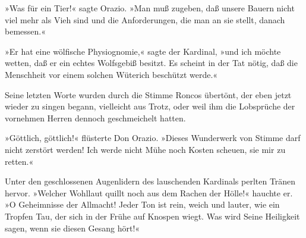 »Was für ein Tier!« sagte Orazio. »Man muß zugeben, daß unsere
Bauern nicht viel mehr als Vieh sind und die Anforderungen, die man
an sie stellt, danach bemessen.«

»Er hat eine wölfische Physiognomie,« sagte der Kardinal, »und ich
möchte wetten, daß er ein echtes Wolfsgebiß besitzt. Es scheint in
der Tat nötig, daß die Menschheit vor einem solchen Wüterich
beschützt werde.«

Seine letzten Worte wurden durch die Stimme Roncos übertönt, der
eben jetzt wieder zu singen begann, vielleicht aus Trotz, oder weil
ihm die Lobsprüche der vornehmen Herren dennoch geschmeichelt
hatten.

»Göttlich, göttlich!« flüsterte Don Orazio. »Dieses Wunderwerk von
Stimme darf nicht zerstört werden! Ich werde nicht Mühe noch Kosten
scheuen, sie mir zu retten.«

Unter den geschlossenen Augenlidern des lauschenden Kardinals
perlten Tränen hervor. »Welcher Wohllaut quillt noch aus dem Rachen
der Hölle!« hauchte er. »O Geheimnisse der Allmacht! Jeder Ton ist
rein, weich und lauter, wie ein \pagenum{[71]} Tropfen Tau, der
sich in der Frühe auf Knospen wiegt. Was wird Seine Heiligkeit
sagen, wenn sie diesen Gesang hört!«

